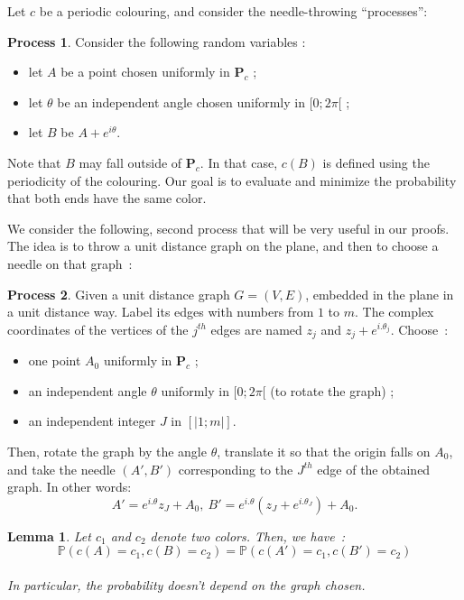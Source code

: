\documentclass[a4paper,11pt]{article}
\newtheorem{lemma}{Lemma}
\theoremstyle{definition}
\newtheorem{process}{Process}
\theoremstyle{remark}
\renewcommand{\P}{\mathbf{P}}
\begin{document}
Let $c$ be a periodic colouring, and consider the needle-throwing ``processes'':
\begin{process} \label{premier}
Consider the following random variables :
\begin{itemize}
  \item let $A$ be a point chosen uniformly 
  in $\P_c$ ;
  \item let $\theta$ be an independent angle chosen uniformly in $[0;2 \pi[$ ;
  \item let $B$ be $A + e^{i \theta}$.
\end{itemize}
\end{process}

Note that $B$ may fall outside of $\P_c$. In that case, $c(B)$ is 
defined using the periodicity of the colouring.
Our goal is to evaluate and minimize the probability that both ends have the 
same color.

We consider the following, second process that will be very useful in our 
proofs. The idea is to throw a unit distance graph on the 
plane, and then to choose a needle on that graph~:
\begin{process}
Given a unit distance graph $G = (V,E)$, embedded in the plane in 
a unit distance way. Label its edges with numbers from 
$1$ to $m$. The complex coordinates of the vertices of the $j^{th}$ edges are 
named $z_j $ and $z_j + e^{i.\theta_j}$. Choose~: 
\begin{itemize}
\item one point $A_0$ uniformly in $\P_c$ ;
\item an independent angle $\theta$ uniformly in $[0;2\pi[$ (to rotate the graph) ;
\item an independent integer $J$ in $[| 1;m|]$.
\end{itemize}
Then, rotate the graph by the angle $\theta$, translate it so that the origin 
falls on $A_0$, and take the needle $(A',B')$ corresponding to the $J^{th}$ 
edge of the obtained graph. In other words:
$$A' = e^{i.\theta} z_J + A_0, \ B' = e^{i.\theta} (z_J + e^{i.\theta_J}) + A_0.$$
\end{process}

\begin{lemma}\label{huitre}
Let $c_1$ and $c_2$ denote 
two colors. Then, we 
have~:\\
 $$\mathbb{P}(c(A) = c_1, c(B) = c_2) = \mathbb{P}(c(A') = c_1, c(B') = c_2) $$ \\
 In particular, the probability doesn't depend on the graph 
 chosen.
\end{lemma}
\end{document}
